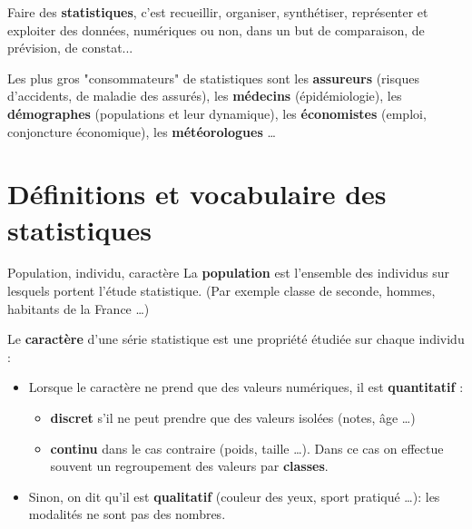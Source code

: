 \documentclass[10pt,a4paper,openany,twoside, eleve]{book}
\begin{document}

\entetegal{}

\vspace{-3mm}
Faire des \textbf{statistiques}, c'est recueillir, organiser, synthétiser, représenter et exploiter des données, numériques ou non, dans un but de comparaison, de prévision, de constat...

\smallskip
Les plus gros "consommateurs" de statistiques sont les \textbf{assureurs} (risques d'accidents, de maladie des assurés), les \textbf{médecins} (épidémiologie), les \textbf{démographes} (populations et leur dynamique), les \textbf{économistes} (emploi, conjoncture économique), les \textbf{météorologues} \dots

\vspace{-5mm}
\section{Définitions et vocabulaire des statistiques}

\begin{defi}{Population, individu, caractère}{}
   La \textbf{population} est l'ensemble des individus sur lesquels portent l'étude statistique. \textsf{(Par exemple classe de seconde, hommes, habitants de la France \dots)}

   \medskip
   Le \textbf{caractère} d'une série statistique est une propriété étudiée sur chaque individu :
   \begin{itemize}
      \item  Lorsque le caractère ne prend que des valeurs numériques, il est \textbf{quantitatif} :
      \begin{itemize}
         \item \textbf{discret} s'il ne peut prendre que des valeurs isolées \textsf{(notes, âge \dots )}
         \item \textbf{continu} dans le cas contraire \textsf{(poids, taille \dots )}. Dans ce cas on effectue souvent un regroupement des valeurs par \textbf{classes}.
      \end{itemize}
      \item  Sinon, on dit qu'il est \textbf{qualitatif} \textsf{(couleur des yeux, sport pratiqué \dots )}: les modalités ne sont pas des nombres.
   \end{itemize}
\end{defi}
\end{document}
